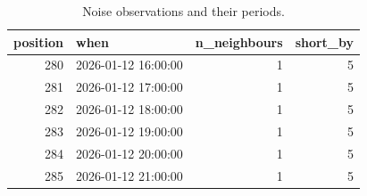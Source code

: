 \begin{table}
\caption{Noise observations and their periods.}
\label{tab:dbscan:noise}
\begin{tabular}{rlrr}
\toprule
position & when & n_neighbours & short_by \\
\midrule
280 & 2026-01-12 16:00:00 & 1 & 5 \\
281 & 2026-01-12 17:00:00 & 1 & 5 \\
282 & 2026-01-12 18:00:00 & 1 & 5 \\
283 & 2026-01-12 19:00:00 & 1 & 5 \\
284 & 2026-01-12 20:00:00 & 1 & 5 \\
285 & 2026-01-12 21:00:00 & 1 & 5 \\
\bottomrule
\end{tabular}
\end{table}
